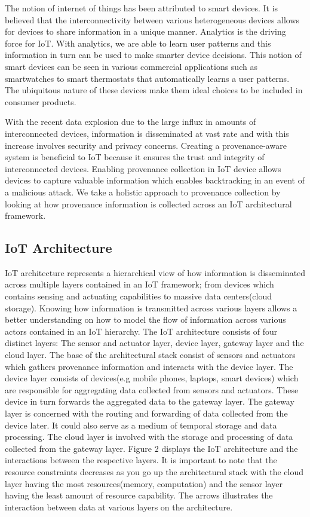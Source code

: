 The notion of internet of things has been attributed to smart devices. It is believed that the interconnectivity between various heterogeneous devices allows for devices to share information in a unique manner. Analytics is the driving force for IoT. With analytics, we are able to learn user patterns  and this information in turn can be used to make smarter device decisions. This notion of smart devices can be seen in various commercial applications such as smartwatches to smart thermostats that automatically learns a user patterns. The ubiquitous nature of these devices make them ideal choices to be included in consumer products. 

\par With the recent data explosion due to the large influx in amounts of interconnected devices, information is disseminated at vast rate and with this increase involves security and privacy concerns. Creating a provenance-aware system is beneficial to IoT because it ensures the trust and  integrity of interconnected devices. Enabling provenance collection in IoT device allows devices to capture valuable information which enables backtracking in an event of a malicious attack. We take a holistic approach to provenance collection by looking at how provenance information is collected across an IoT architectural framework.

 
  \subsection{IoT Architecture}

IoT architecture represents a hierarchical view of how information is disseminated across multiple layers contained in an IoT framework; from devices which contains sensing and actuating capabilities to massive data centers(cloud storage). Knowing how information is transmitted across various layers allows a better understanding on how to model the flow of information across various actors contained in an IoT hierarchy. The IoT architecture consists of four distinct layers: The sensor and actuator layer, device layer, gateway layer and the cloud layer. The base of the architectural stack consist of sensors and actuators which gathers provenance information and interacts with the device layer. The device layer consists of devices(e.g mobile phones, laptops, smart devices) which are responsible for aggregating data collected from sensors and actuators. These device in turn forwards the aggregated data to the gateway layer. The gateway layer is concerned with the routing and forwarding of data collected from the device later. It could also serve as a medium of temporal storage and data processing. The cloud layer is involved with the storage and processing of data collected from the gateway layer. Figure 2 displays the IoT architecture and the interactions between the respective  layers. It is important to note that the resource constraints decreases as you go up the architectural stack with the cloud layer having the most resources(memory, computation) and the sensor layer having the least amount of resource capability. The arrows illustrates the interaction between data at various layers on the architecture.


